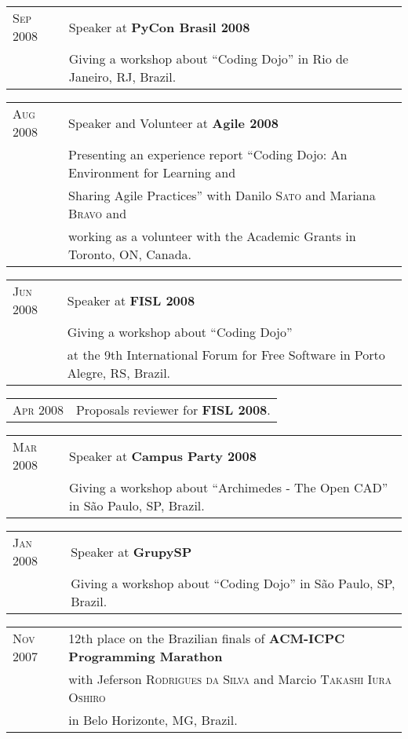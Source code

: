 \documentclass[letter,10pt]{article}
\begin{document}
\begin{tabular}{p{2.5cm}l}
  \textsc{Sep 2008} & Speaker at \textbf{PyCon Brasil 2008}\\
  &Giving a workshop about ``Coding Dojo'' in Rio de Janeiro, RJ, Brazil.\\
\end{tabular}

\begin{tabular}{p{2.5cm}l}
  \textsc{Aug 2008} & Speaker and Volunteer at \textbf{Agile 2008}\\
  &Presenting an experience report ``Coding Dojo: An Environment for
  Learning and\\
  & Sharing Agile Practices'' with Danilo \textsc{Sato} and Mariana \textsc{Bravo} and\\
  & working as a volunteer with the Academic Grants in Toronto, ON, Canada.\\
\end{tabular}

\begin{tabular}{p{2.5cm}l}
  \textsc{Jun 2008} & Speaker at \textbf{FISL 2008}\\
  &Giving a workshop about ``Coding Dojo''\\
  & at the 9th International Forum for Free Software in Porto
  Alegre, RS, Brazil.\\
\end{tabular}

\begin{tabular}{p{2.5cm}l}
  \textsc{Apr 2008} & Proposals reviewer for \textbf{FISL 2008}.\\
\end{tabular}

\begin{tabular}{p{2.5cm}l}
  \textsc{Mar 2008} & Speaker at \textbf{Campus Party 2008}\\
  &Giving a workshop about ``Archimedes - The Open CAD'' in São Paulo, SP, Brazil.\\
\end{tabular}

\begin{tabular}{p{2.5cm}l}
  \textsc{Jan 2008} & Speaker at \textbf{GrupySP}\\
  &Giving a workshop about ``Coding Dojo'' in São Paulo, SP, Brazil.\\
\end{tabular}

\begin{tabular}{p{2.5cm}l}
  \textsc{Nov 2007} & 12th place on the Brazilian finals of \textbf{ACM-ICPC
    Programming Marathon}\\
  & with Jeferson \textsc{Rodrigues da Silva} and Marcio
  \textsc{Takashi Iura Oshiro}\\
  & in Belo Horizonte, MG, Brazil.\\
\end{tabular}
\end{document}
